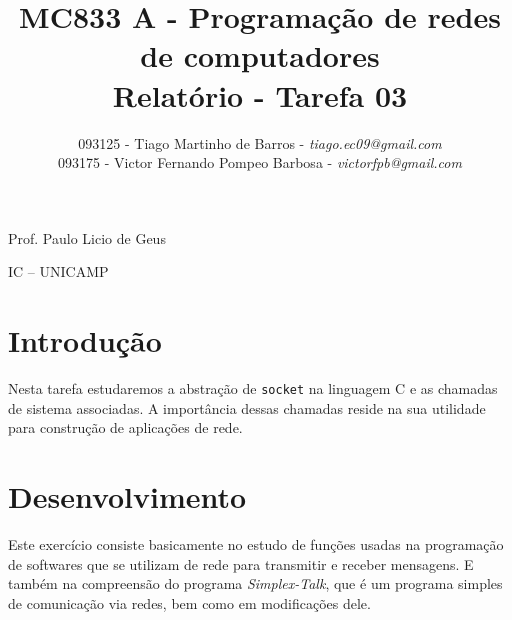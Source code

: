 \documentclass[a4paper,10pt]{article}
\begin{document}


\title{MC833 A - Programação de redes de computadores\\
Relatório - Tarefa 03}

\author {   093125 - Tiago Martinho de Barros - \textit{tiago.ec09@gmail.com}\\
            093175 - Victor Fernando Pompeo Barbosa - \textit{victorfpb@gmail.com}}


\maketitle

\centerline{Prof. Paulo Licio de Geus}
\centerline{IC -- UNICAMP}

\vspace{2cm}
\tableofcontents
    
\newpage
\section{Introdução}
\hspace{14pt}

    Nesta tarefa estudaremos a abstração de {\tt socket} na linguagem C e as chamadas de sistema associadas. A importância dessas chamadas reside na sua utilidade para construção de aplicações de rede.


\section{Desenvolvimento}

Este exercício consiste basicamente no estudo de funções usadas na programação de softwares que se utilizam de rede para transmitir e receber mensagens. E também na compreensão do programa \textit{Simplex-Talk}, que é um programa simples de comunicação via redes, bem como em modificações dele.
\end{document}
